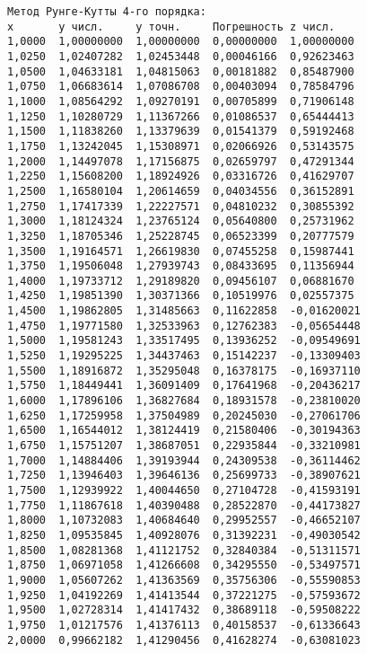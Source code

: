 \begin{verbatim}
Метод Рунге-Кутты 4-го порядка:
x		y числ.		y точн.		Погрешность	z числ.
1,0000	1,00000000	1,00000000	0,00000000	1,00000000
1,0250	1,02407282	1,02453448	0,00046166	0,92623463
1,0500	1,04633181	1,04815063	0,00181882	0,85487900
1,0750	1,06683614	1,07086708	0,00403094	0,78584796
1,1000	1,08564292	1,09270191	0,00705899	0,71906148
1,1250	1,10280729	1,11367266	0,01086537	0,65444413
1,1500	1,11838260	1,13379639	0,01541379	0,59192468
1,1750	1,13242045	1,15308971	0,02066926	0,53143575
1,2000	1,14497078	1,17156875	0,02659797	0,47291344
1,2250	1,15608200	1,18924926	0,03316726	0,41629707
1,2500	1,16580104	1,20614659	0,04034556	0,36152891
1,2750	1,17417339	1,22227571	0,04810232	0,30855392
1,3000	1,18124324	1,23765124	0,05640800	0,25731962
1,3250	1,18705346	1,25228745	0,06523399	0,20777579
1,3500	1,19164571	1,26619830	0,07455258	0,15987441
1,3750	1,19506048	1,27939743	0,08433695	0,11356944
1,4000	1,19733712	1,29189820	0,09456107	0,06881670
1,4250	1,19851390	1,30371366	0,10519976	0,02557375
1,4500	1,19862805	1,31485663	0,11622858	-0,01620021
1,4750	1,19771580	1,32533963	0,12762383	-0,05654448
1,5000	1,19581243	1,33517495	0,13936252	-0,09549691
1,5250	1,19295225	1,34437463	0,15142237	-0,13309403
1,5500	1,18916872	1,35295048	0,16378175	-0,16937110
1,5750	1,18449441	1,36091409	0,17641968	-0,20436217
1,6000	1,17896106	1,36827684	0,18931578	-0,23810020
1,6250	1,17259958	1,37504989	0,20245030	-0,27061706
1,6500	1,16544012	1,38124419	0,21580406	-0,30194363
1,6750	1,15751207	1,38687051	0,22935844	-0,33210981
1,7000	1,14884406	1,39193944	0,24309538	-0,36114462
1,7250	1,13946403	1,39646136	0,25699733	-0,38907621
1,7500	1,12939922	1,40044650	0,27104728	-0,41593191
1,7750	1,11867618	1,40390488	0,28522870	-0,44173827
1,8000	1,10732083	1,40684640	0,29952557	-0,46652107
1,8250	1,09535845	1,40928076	0,31392231	-0,49030542
1,8500	1,08281368	1,41121752	0,32840384	-0,51311571
1,8750	1,06971058	1,41266608	0,34295550	-0,53497571
1,9000	1,05607262	1,41363569	0,35756306	-0,55590853
1,9250	1,04192269	1,41413544	0,37221275	-0,57593672
1,9500	1,02728314	1,41417432	0,38689118	-0,59508222
1,9750	1,01217576	1,41376113	0,40158537	-0,61336643
2,0000	0,99662182	1,41290456	0,41628274	-0,63081023


\end{verbatim}
